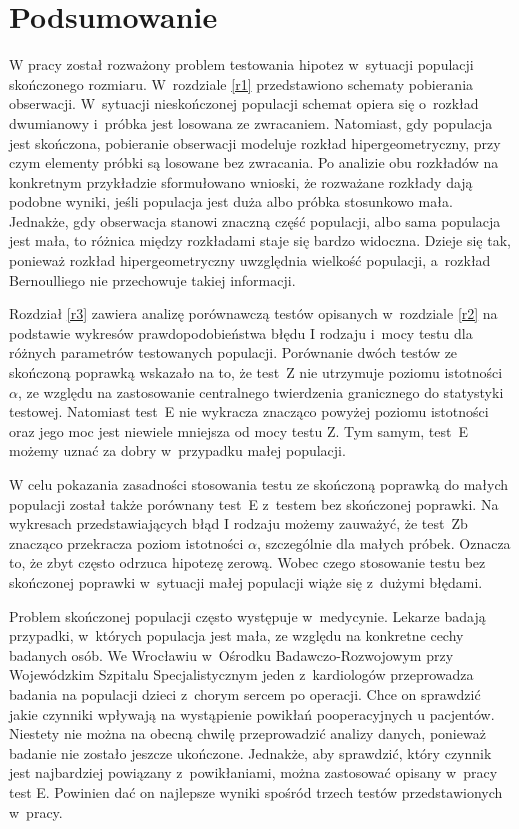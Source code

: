 \chapter*{Podsumowanie}

W pracy został rozważony problem testowania hipotez w~sytuacji populacji skończonego rozmiaru. W~rozdziale \ref{r1} przedstawiono schematy pobierania obserwacji. W~sytuacji nieskończonej populacji schemat opiera się o~rozkład dwumianowy i~próbka jest losowana ze zwracaniem. Natomiast, gdy populacja jest skończona, pobieranie obserwacji modeluje rozkład hipergeometryczny, przy czym elementy próbki są losowane bez zwracania. Po analizie obu rozkładów na konkretnym przykładzie sformułowano wnioski, że rozważane rozkłady dają podobne wyniki, jeśli populacja jest duża albo próbka stosunkowo mała. Jednakże, gdy obserwacja stanowi znaczną część populacji, albo sama populacja jest mała, to różnica między rozkładami staje się bardzo widoczna. Dzieje się tak, ponieważ rozkład hipergeometryczny uwzględnia wielkość populacji, a~rozkład Bernoulliego nie przechowuje takiej informacji.

Rozdział \ref{r3} zawiera analizę porównawczą testów opisanych w~rozdziale \ref{r2} na podstawie wykresów prawdopodobieństwa błędu I rodzaju i~mocy testu dla różnych parametrów testowanych populacji. Porównanie dwóch testów ze skończoną poprawką wskazało na to, że test~Z nie utrzymuje poziomu istotności $\alpha$, ze względu na zastosowanie centralnego twierdzenia granicznego do statystyki testowej. Natomiast test~E nie wykracza znacząco powyżej poziomu istotności oraz jego moc jest niewiele mniejsza od mocy testu Z. Tym samym, test~E możemy uznać za dobry w~przypadku małej populacji.

W celu pokazania zasadności stosowania testu ze skończoną poprawką do małych populacji został także porównany test~E z~testem bez skończonej poprawki. Na wykresach przedstawiających błąd I rodzaju możemy zauważyć, że test~Zb znacząco przekracza poziom istotności $\alpha$, szczególnie dla małych próbek. Oznacza to, że zbyt często odrzuca hipotezę zerową. Wobec czego stosowanie testu bez skończonej poprawki w~sytuacji małej populacji wiąże się z~dużymi błędami.

Problem skończonej populacji często występuje w~medycynie. Lekarze badają przypadki, w~których populacja jest mała, ze względu na konkretne cechy badanych osób. We Wrocławiu w~Ośrodku Badawczo-Rozwojowym przy Wojewódzkim Szpitalu Specjalistycznym jeden z~kardiologów przeprowadza badania na populacji dzieci z~chorym sercem po operacji. Chce on sprawdzić jakie czynniki wpływają na wystąpienie powikłań pooperacyjnych u pacjentów. Niestety nie można na obecną chwilę przeprowadzić analizy danych, ponieważ badanie nie zostało jeszcze ukończone. Jednakże, aby sprawdzić, który czynnik jest najbardziej powiązany z~powikłaniami, można zastosować opisany w~pracy test E. Powinien dać on najlepsze wyniki spośród trzech testów przedstawionych w~pracy.